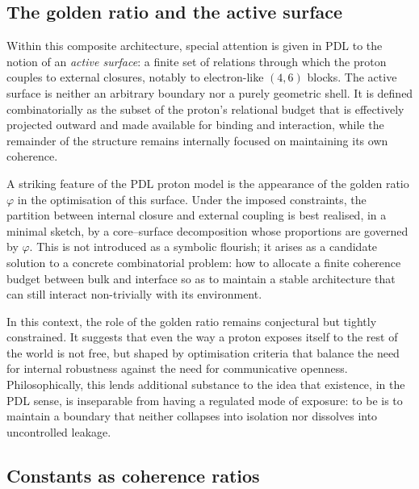 \documentclass[11pt,a4paper]{article}
\theoremstyle{definition}
\begin{document}
\subsection{The golden ratio and the active surface}

Within this composite architecture, special attention is given in PDL to the notion of an \emph{active surface}: a finite set of relations through which the proton couples to external closures, notably to electron-like \((4,6)\) blocks.\cite{Laubscher_GoldenRatio_Sketch_2024,Laubscher_Born_Golden_v2_2024} The active surface is neither an arbitrary boundary nor a purely geometric shell. It is defined combinatorially as the subset of the proton’s relational budget that is effectively projected outward and made available for binding and interaction, while the remainder of the structure remains internally focused on maintaining its own coherence.

A striking feature of the PDL proton model is the appearance of the golden ratio \(\varphi\) in the optimisation of this surface. Under the imposed constraints, the partition between internal closure and external coupling is best realised, in a minimal sketch, by a core–surface decomposition whose proportions are governed by \(\varphi\).\cite{Laubscher_GoldenRatio_Sketch_2024,Laubscher_Alpha_v2_2024} This is not introduced as a symbolic flourish; it arises as a candidate solution to a concrete combinatorial problem: how to allocate a finite coherence budget between bulk and interface so as to maintain a stable architecture that can still interact non-trivially with its environment.

In this context, the role of the golden ratio remains conjectural but tightly constrained. It suggests that even the way a proton exposes itself to the rest of the world is not free, but shaped by optimisation criteria that balance the need for internal robustness against the need for communicative openness.\cite{Laubscher_GoldenRatio_Sketch_2024,Laubscher_Born_Golden_v2_2024} Philosophically, this lends additional substance to the idea that existence, in the PDL sense, is inseparable from having a regulated mode of exposure: to be is to maintain a boundary that neither collapses into isolation nor dissolves into uncontrolled leakage.

\subsection{Constants as coherence ratios}
\end{document}
